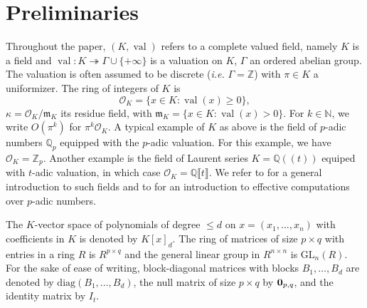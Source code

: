 \documentclass[a4paper,oneside,10pt]{article}
\newcommand{\N}{\mathbb{N}} %
\DeclareMathOperator{\val}{val}
\def\QQ{\ensuremath{\mathbb{Q}}}
\def\ZZ{\ensuremath{\mathbb{Z}}}
\newcommand{\OK}{\mathcal{O}_K}
\def\diag{\mathrm{diag}}
\newcommand{\GL}{\mathrm{GL}}
\begin{document}


\section{Preliminaries}

Throughout the paper, $(K,\val)$ refers to a complete valued field, namely $K$ is a field
and $\val : K \twoheadrightarrow \Gamma \cup \{+\infty\}$ is a valuation on $K$, $\Gamma$ an
ordered abelian group. The valuation is often assumed to be discrete ({\it i.e.} $\Gamma=\ZZ$)
with $\pi \in K$ a uniformizer. The ring of integers of $K$ is
$$
\OK = \{x \in K : \val(x) \geq 0\},
$$
$\kappa = \OK/\mathfrak{m}_K$ its residue field, with
$\mathfrak{m}_K = \{x \in K : \val(x) > 0\}$.
For $k \in \N$, we write $O(\pi^k)$ for $\pi^k \OK$.
A typical example of $K$ as above is the field of $p$-adic numbers 
$\QQ_p$ equipped with the $p$-adic valuation. For this example, we 
have $\OK = \ZZ_p$. Another example is the field of Laurent series
$K=\QQ(\!(t)\!)$ equiped with $t$-adic valuation,
in which case $\OK = \QQ \llbracket t \rrbracket$.
We refer to \cite{Serre:1979,engler2005valued} for a
general introduction to such fields
and to \cite{caruso_computations_2017}
for an introduction to effective computations over $p$-adic numbers.

The $K$-vector space of polynomials of degree $\leq d$ on $x=(x_1,\ldots,x_n)$
with coefficients in $K$ is denoted by $K[x]_{d}$. The ring of matrices of
size $p \times q$ with entries in a ring $R$ is $R^{p \times q}$ and the general
linear group in $R^{n \times n}$ is $\GL_n(R)$.
For the sake of ease of writing, block-diagonal matrices with blocks
$B_1,\ldots,B_d$ are denoted by $\diag(B_1, \ldots, B_d)$, the null matrix of
size $p \times q$ by ${\bf 0}_{p,q}$, and the identity matrix by $I_t$.
\end{document}

